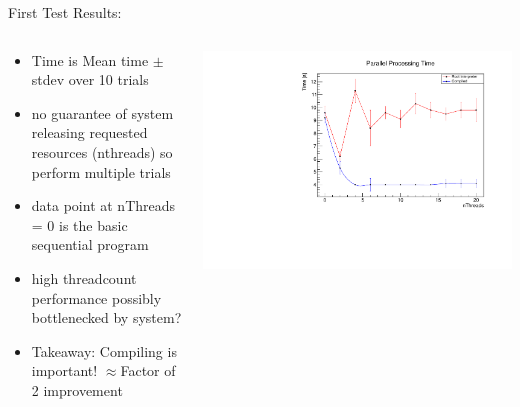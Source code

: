 \documentclass[10pt]{beamer}
\begin{document}
\begin{frame}
First Test Results:\\
\begin{columns}
	\begin{column}{0.5\textwidth}
	\begin{itemize}
		\scriptsize
		\item Time is Mean time $\pm$ stdev over 10 trials
		\item no guarantee of system releasing requested resources (nthreads) so perform multiple trials
		\item data point at nThreads = 0 is the basic sequential program
		\item high threadcount performance possibly bottlenecked by system?
		\item Takeaway: Compiling is important! $\approx $Factor of 2 improvement
	\end{itemize}
	\end{column}
	\begin{column}{0.5\textwidth}
   		\includegraphics[scale=0.3, left]{../ParTree/test1plot.pdf}

	\end{column}
\end{columns}
\end{frame}
\end{document}
